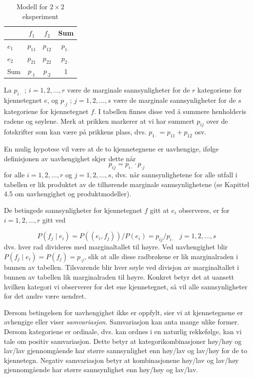 \begin{table} \centering 
\begin{tabular}{l|cc|c}
      &  $f_1$    &  $f_2$   &  Sum  \\ \hline
$e_1$ &  $p_{11}$ &  $p_{12}$& $p_{1\cdot}$  \\ 
$e_2$ &  $p_{21}$ &  $p_{22}$& $p_{2\cdot}$ \\  \hline
Sum   & $p_{\cdot 1}$&$p_{\cdot 2}$&   1    \\ \hline
\end{tabular}
\caption{Modell for $2\times 2$ eksperiment}
\label{tab:modell2x2} %
\end{table}

La $p_{i\cdot}$ ; $i=1,2,\ldots ,r$ være de marginale sannsynligheter
for de $r$ kate\-goriene for kjennetegnet $e$, og
$p_{\cdot j}$ ; $j=1,2,\ldots ,s$ være de marginale sannsynligheter
for de $s$ kategoriene for kjennetegnet $f$.
I tabellen finnes disse ved å summere henholdsvis radene og søylene.
Merk at prikken mar\-kerer at vi har summert $p_{ij}$ over de fotskrifter som
kan være på prikkens plass, dvs. $p_{1\cdot } = p_{11} + p_{12}$
osv.

En mulig hypotese vil være at de to kjennetegnene er uavhengige,
 ifølge definisjonen av uavhengighet skjer dette når
\[    p_{ij} = p_{i\cdot } \cdot  p_{\cdot j}            \]
for alle $i=1,2,\ldots ,r$ og $j=1,2,\ldots ,s$, dvs. når sannsynlighetene
for alle utfall i tabellen er lik produktet av de tilhørende marginale
sannsynlighetene (se Kapittel 4.5 om uavhengighet og produktmodeller). 

De betingede sannsynligheter for kjennetegnet $f$ gitt at $e_i$ observeres,
er for $i=1,2,\ldots ,r$ gitt ved

\[ P(f_j\mid e_i)=P((e_i,f_j))/P(e_i)=p_{ij}/p_{i\cdot} \mbox{\ \ \ }
                                                     j=1,2,\ldots ,s   \]
dvs. hver rad divideres med marginaltallet til høyre. Ved uavhengighet
blir $P(f_j\mid e_i)=P(f_j)=p_{\cdot j}$, slik at alle disse radbrøkene
er lik marginalraden i bunnen av tabellen. Tilsvarende blir hver søyle ved
divisjon av marginaltallet i bunnen av tabellen lik marginalraden til høyre.
Konkret betyr det at uansett hvilken kategori vi observerer for det ene
kjennetegnet, så vil alle sannsynligheter for det andre være uendret.

Dersom betingelsen for uavhengighet ikke er oppfylt, sier vi at kjennetegnene
er avhengige eller viser {\em samvariasjon}. Samvariasjon kan anta mange ulike 
former. Dersom kategoriene er ordinale, dvs. kan ordnes i en naturlig
rekkefølge, kan vi tale om positiv samvariasjon. Dette betyr at
kategorikombinasjoner høy/høy og lav/lav  gjennomgående
har større sannsynlighet enn høy/lav og lav/høy for de to kjennetegn.
Negativ samvariasjon betyr at kombinasjonene høy/lav og lav/høy
gjennomgående har større sannsynlighet enn høy/høy og lav/lav.

